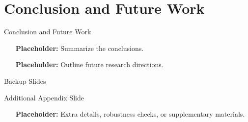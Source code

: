 \documentclass[aspectratio=1610]{beamer}
\begin{document}
\section{Conclusion and Future Work}
\begin{frame}{Conclusion and Future Work}
  \begin{itemize}
    \item [\textbf{Placeholder:}] Summarize the conclusions.
    \item [\textbf{Placeholder:}] Outline future research directions.
  \end{itemize}
\end{frame}

\appendix

\begin{frame}[plain]
  \centering
  \Huge Backup Slides
\end{frame}

\begin{frame}{Additional Appendix Slide}
  \begin{itemize}
    \item [\textbf{Placeholder:}] Extra details, robustness checks, or supplementary materials.
  \end{itemize}
\end{frame}
\end{document}
